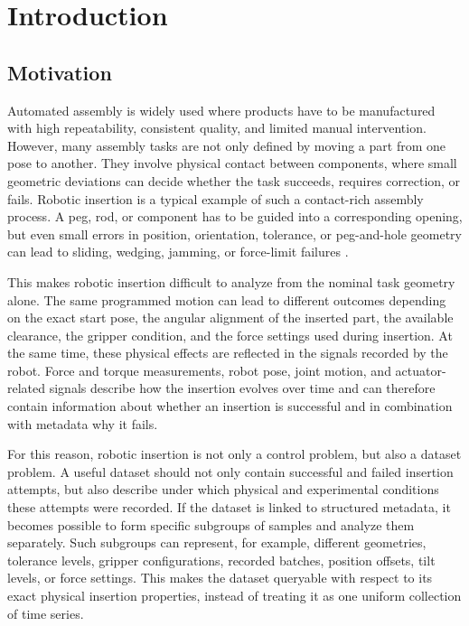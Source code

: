 \chapter{Introduction}
\label{ch:intro}

\section{Motivation}
\label{sec:motivation}

Automated assembly is widely used where products have to be manufactured with high repeatability, consistent quality, and limited manual intervention. However, many assembly tasks are not only defined by moving a part from one pose to another. They involve physical contact between components, where small geometric deviations can decide whether the task succeeds, requires correction, or fails. Robotic insertion is a typical example of such a contact-rich assembly process. A peg, rod, or component has to be guided into a corresponding opening, but even small errors in position, orientation, tolerance, or peg-and-hole geometry can lead to sliding, wedging, jamming, or force-limit failures \cite{xuCompareContactModelbased2019,tangAutonomousAlignmentPeg2016,feiContactJammingAnalysis2004b}.

This makes robotic insertion difficult to analyze from the nominal task geometry alone. The same programmed motion can lead to different outcomes depending on the exact start pose, the angular alignment of the inserted part, the available clearance, the gripper condition, and the force settings used during insertion. At the same time, these physical effects are reflected in the signals recorded by the robot. Force and torque measurements, robot pose, joint motion, and actuator-related signals describe how the insertion evolves over time and can therefore contain information about whether an insertion is successful and in combination with metadata why it fails.

For this reason, robotic insertion is not only a control problem, but also a dataset problem. A useful dataset should not only contain successful and failed insertion attempts, but also describe under which physical and experimental conditions these attempts were recorded. If the dataset is linked to structured metadata, it becomes possible to form specific subgroups of samples and analyze them separately. Such subgroups can represent, for example, different geometries, tolerance levels, gripper configurations, recorded batches, position offsets, tilt levels, or force settings. This makes the dataset queryable with respect to its exact physical insertion properties, instead of treating it as one uniform collection of time series.

